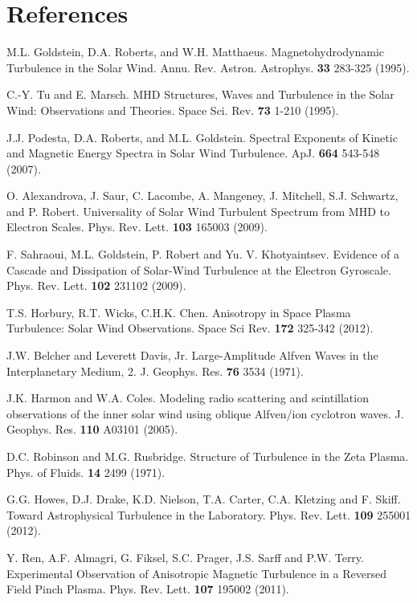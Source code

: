 \documentclass[aip,prl,amsmath,amssymb,reprint,superscriptaddress]{revtex4-1} %
\begin{document}
\section*{References}
\begin{thebibliography}{99}

 M.L. Goldstein, D.A. Roberts, and W.H. Matthaeus. Magnetohydrodynamic Turbulence in the Solar Wind. Annu. Rev. Astron. Astrophys. {\bf 33} 283-325 (1995).

 C.-Y. Tu and E. Marsch. MHD Structures, Waves and Turbulence in the Solar Wind: Observations and Theories. Space Sci. Rev. {\bf 73} 1-210 (1995).

 J.J. Podesta, D.A. Roberts, and M.L. Goldstein. Spectral Exponents of Kinetic and Magnetic Energy Spectra in Solar Wind Turbulence. ApJ. {\bf 664} 543-548 (2007).

 O. Alexandrova, J. Saur, C. Lacombe, A. Mangeney, J. Mitchell, S.J. Schwartz, and P. Robert. Universality of Solar Wind Turbulent Spectrum from MHD to Electron Scales. Phys. Rev. Lett. {\bf 103} 165003 (2009).

 F. Sahraoui, M.L. Goldstein, P. Robert and Yu. V. Khotyaintsev. Evidence of a Cascade and Dissipation of Solar-Wind Turbulence at the Electron Gyroscale. Phys. Rev. Lett. {\bf 102} 231102 (2009).

 T.S. Horbury, R.T. Wicks, C.H.K. Chen. Anisotropy in Space Plasma Turbulence: Solar Wind Observations. Space Sci Rev. {\bf 172} 325-342 (2012).

 J.W. Belcher and Leverett Davis, Jr. Large-Amplitude Alfven Waves in the Interplanetary Medium, 2. J. Geophys. Res. {\bf 76} 3534 (1971).

 J.K. Harmon and W.A. Coles. Modeling radio scattering and scintillation observations of the inner solar wind using oblique Alfven/ion cyclotron waves. J. Geophys. Res. {\bf 110} A03101 (2005).

 D.C. Robinson and M.G. Rusbridge. Structure of Turbulence in the Zeta Plasma. Phys. of Fluids. {\bf 14} 2499 (1971).

 G.G. Howes, D.J. Drake, K.D. Nielson, T.A. Carter, C.A. Kletzing and F. Skiff. Toward Astrophysical Turbulence in the Laboratory. Phys. Rev. Lett. {\bf 109} 255001 (2012).

 Y. Ren, A.F. Almagri, G. Fiksel, S.C. Prager, J.S. Sarff and P.W. Terry. Experimental Observation of Anisotropic Magnetic Turbulence in a Reversed Field Pinch Plasma. Phys. Rev. Lett. {\bf 107} 195002 (2011).


\end{thebibliography}
\end{document}

